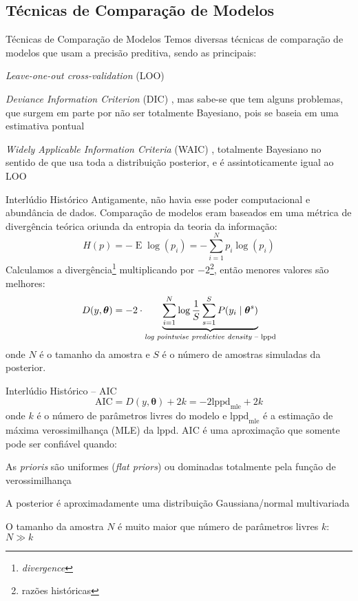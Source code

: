 \subsection{Técnicas de Comparação de Modelos}
\begin{frame}{Técnicas de Comparação de Modelos}
	Temos diversas técnicas de comparação de modelos que usam a precisão preditiva,
	sendo as principais:
	\begin{vfilleditems}
		\item \textit{Leave-one-out cross-validation} (LOO)
		\parencite{vehtariPracticalBayesianModel2015}
		\item \textit{Deviance Information Criterion} (DIC)
		\parencite{spiegelhalter2002bayesian},  mas sabe-se que tem alguns problemas,
		que surgem em parte por não ser totalmente Bayesiano,
		pois se baseia em uma estimativa pontual \parencite{van2005dic}
		\item \textit{Widely Applicable Information Criteria} (WAIC)
		\parencite{watanabe2010asymptotic}, totalmente Bayesiano no sentido
		de que usa toda a distribuição posterior, e é assintoticamente igual ao
		LOO \parencite{vehtariPracticalBayesianModel2015}
	\end{vfilleditems}
\end{frame}

\begin{frame}{Interlúdio Histórico}
	\small
	Antigamente, não havia esse poder computacional e abundância de dados.
	Comparação de modelos eram baseados em uma métrica de divergência teórica
	oriunda da entropia da teoria da informação:
	$$
		H(p) = - \operatorname{E}\log(p_i) = -\sum^N_{i=1} p_i \log(p_i)
	$$
	\small
	Calculamos a divergência\footnote{\textit{divergence}} multiplicando por
	$-2$\footnote{razões históricas},
	então menores valores são melhores:
	$$
		D(y, \boldsymbol{\theta}) = -2 \cdot \underbrace{\sum^N_{i=1} \log \frac{1}{S}\sum^S_{s=1} P(y_i \mid \boldsymbol{\theta}^s)}_{\text{\textit{log pointwise predictive density} -- lppd}}
	$$
	\footnotesize
	onde $N$ é o tamanho da amostra e $S$ é o número de amostras simuladas da posterior.
\end{frame}

\begin{frame}{Interlúdio Histórico -- AIC \parencite{akaike1998information}}
	$$\text{AIC} = D(y, \boldsymbol{\theta}) + 2k = -2 \text{lppd}_{\text{mle}} + 2k$$
	onde $k$ é o número de parâmetros livres do modelo e $\text{lppd}_{\text{mle}}$ é
	a estimação de máxima verossimilhança (MLE) da lppd.
	\vfill
	AIC é uma aproximação que somente pode ser confiável quando:
	\begin{vfilleditems}
		\item As \textit{prioris} são uniformes (\textit{flat priors}) ou dominadas totalmente pela função de verossimilhança
		\item A posterior é aproximadamente uma distribuição Gaussiana/normal multivariada
		\item O tamanho da amostra $N$ é muito maior que número de parâmetros livres $k$: $N \gg k$
	\end{vfilleditems}
\end{frame}

